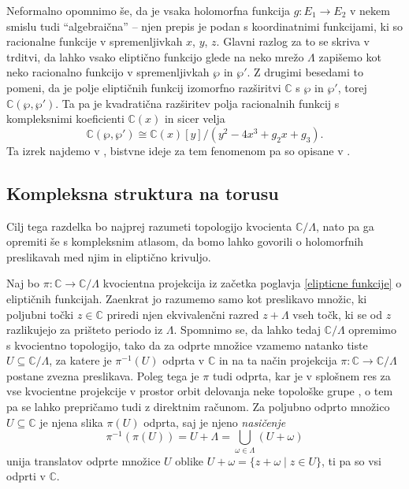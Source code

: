 \documentclass[mat1]{fmfdelo}
\numberwithin{equation}{section}
\newcommand{\C}{\mathbb C}
\newcommand{\om}{\omega}
\newcommand{\inv}{^{-1}}
\newcommand{\iso}{\cong}
\newcommand{\bigslant}[2]{{\raisebox{.2em}{$#1$}\left/\raisebox{-.2em}{$#2$}\right.}}
\theoremstyle{definition}
\begin{document}
Neformalno opomnimo še, da je vsaka holomorfna funkcija $g: E_1 \to E_2$ v nekem smislu tudi ``algebraična'' -- njen prepis je podan s koordinatnimi funkcijami, ki so racionalne funkcije v spremenljivkah $x$, $y$, $z$. Glavni razlog za to se skriva v trditvi, da lahko vsako eliptično funkcijo glede na neko mrežo $\Lambda$ zapišemo kot neko racionalno funkcijo v spremenljivkah $\wp$ in $\wp'$. Z drugimi besedami to pomeni, da je polje eliptičnih funkcij izomorfno razširitvi $\C$ s $\wp$ in $\wp'$, torej $\C(\wp, \wp')$. Ta pa je kvadratična razširitev polja racionalnih funkcij s kompleksnimi koeficienti $\C(x)$ in sicer velja
\[
    \C(\wp, \wp') \iso 
    \C(x)[y]/(y^2 - 4x^3 + g_2x + g_3).
\]
Ta izrek najdemo v \cite[\textbf{1}, \S2, theorem 4]{LangEllfunc}, bistvne ideje za tem fenomenom pa so opisane v \cite[\S 2 in \S 3]{Stevenhagen}.




\subsection{Kompleksna struktura na torusu}
Cilj tega razdelka bo najprej razumeti topologijo kvocienta $\C/\Lambda$, nato pa ga opremiti še s kompleksnim atlasom, da bomo lahko govorili o holomorfnih preslikavah med njim in eliptično krivuljo. 

Naj bo $\pi: \C \to \C/\Lambda$ kvocientna projekcija iz začetka poglavja \ref{elipticne funkcije} o eliptičnih funkcijah. Zaenkrat jo razumemo samo kot preslikavo množic, ki poljubni točki $z \in \C$ priredi njen ekvivalenčni razred $z + \Lambda$ vseh točk, ki se od $z$ razlikujejo za prišteto periodo iz $\Lambda$. Spomnimo se, da lahko tedaj $\C/\Lambda$ opremimo s kvocientno topologijo, tako da za odprte množice vzamemo natanko tiste $U \subseteq \C/\Lambda$, za katere je $\pi\inv (U)$ odprta v $\C$ in na ta način projekcija $\pi:\C \to \C/\Lambda$ postane zvezna preslikava. Poleg tega je $\pi$ tudi odprta, kar je v splošnem res za vse kvocientne projekcije v prostor orbit delovanja neke topološke grupe \cite[trditev 3.42]{MrcunTop}, o tem pa se lahko prepričamo tudi z direktnim računom. Za poljubno odprto množico $U \subseteq \C$ je njena slika $\pi(U)$ odprta, saj je njeno \emph{nasičenje}
\[
    \pi\inv(\pi(U)) = U + \Lambda = \bigcup_{\om \in \Lambda} (U + \om)
\]
unija translatov odprte množice $U$ oblike $U + \om = \{z + \om \mid z \in U \}$, ti pa so vsi odprti v $\C$. 
\end{document}
